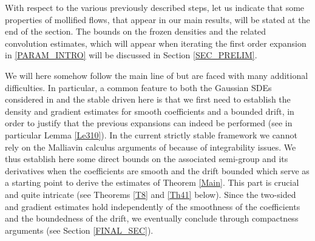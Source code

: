 \documentclass[11pt]{article}
\numberwithin{equation}{section}\providecommand{\asymp}{\mathrel{\sim}}
\theoremstyle{plain}
\theoremstyle{definition}
\newcommand\1{{\mathbf{1}}}
\begin{document}
{With respect to the various previously described steps, let us indicate that some properties of mollified flows, that appear in our main results, will be stated at the end of the section. The bounds on the frozen densities and the related convolution estimates, which will appear when iterating the first order expansion in \eqref{PARAM_INTRO} will be discussed in Section \ref{SEC_PRELIM}.}

We will here somehow follow the main line of \cite{meno:pesc:zhan:20} but are faced with many additional difficulties. In particular, a common feature to both the Gaussian SDEs considered in \cite{meno:pesc:zhan:20} and the stable driven here is that we first need to establish the density and gradient estimates for smooth coefficients and a bounded drift, in order to justify that the previous expansions can indeed be performed (see in particular Lemma \ref{Le310}).
In the current strictly stable framework we cannot rely on the Malliavin calculus arguments of \cite{meno:pesc:zhan:20} because of integrability issues.
We thus establish here some direct bounds on the associated semi-group and its derivatives when the coefficients are smooth and {the drift bounded} which serve as a starting point to derive the estimates of Theorem \ref{Main}. This part is crucial and quite intricate (see Theorems {\ref{T8} and} \ref{Th41} below).
Since the two-sided and gradient estimates hold independently of the smoothness of the coefficients and the boundedness of the drift, we eventually conclude through compactness arguments (see Section \ref{FINAL_SEC}).
\end{document}
